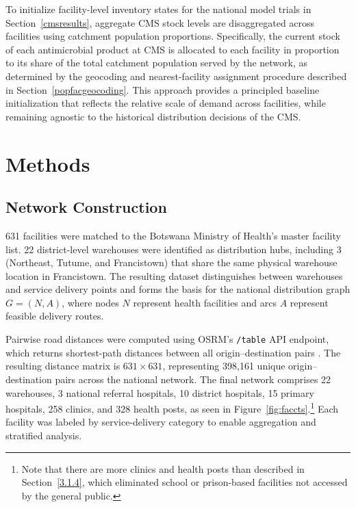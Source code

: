\documentclass{article}
\begin{document}
To initialize facility-level inventory states for the national model trials in Section~\ref{cmsresults}, aggregate CMS stock levels are disaggregated across facilities using catchment population proportions. Specifically, the current stock of each antimicrobial product at CMS is allocated to each facility in proportion to its share of the total catchment population served by the network, as determined by the geocoding and nearest-facility assignment procedure described in Section~\ref{popfacgeocoding}. This approach provides a principled baseline initialization that reflects the relative scale of demand across facilities, while remaining agnostic to the historical distribution decisions of the CMS.

\section{Methods}

\subsection{Network Construction}
\label{4.1}

631 facilities were matched to the Botswana Ministry of Health's master facility list. 22 district-level warehouses were identified as distribution hubs, including 3 (Northeast, Tutume, and Francistown) that share the same physical warehouse location in Francistown. The resulting dataset distinguishes between warehouses and service delivery points and forms the basis for the national distribution graph $G = (N, A)$, where nodes $N$ represent health facilities and arcs $A$ represent feasible delivery routes.

Pairwise road distances were computed using OSRM's \texttt{/table} API endpoint, which returns shortest-path distances between all origin--destination pairs \cite{osrm}. The resulting distance matrix is 
$631 \times 631$, representing 398{,}161 unique origin--destination pairs across the national network. The final network comprises 22 warehouses, 3 national referral hospitals, 10 district hospitals, 15 primary hospitals, 258 clinics, and 328 health posts, as seen in Figure~\ref{fig:faccts}.\footnote{Note that there are more clinics and health posts than described in Section~\ref{3.1.4}, which eliminated school or prison-based facilities not accessed by the general public.} Each facility was labeled by service-delivery category to enable aggregation and stratified analysis.
\end{document}
